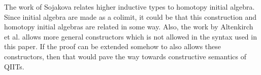 \documentclass[a4paper,UKenglish]{lipics-v2016}
\begin{document}
The work of Sojakova \cite{sojakova2015higher} relates higher inductive types to homotopy initial algebra.
Since initial algebra are made as a colimit, it could be that this construction and homotopy initial algebras are related in some way.
Also, the work by Altenkirch et al. \cite{altenkirch2016quotient} allows more general constructors which is not allowed in the syntax used in this paper.
If the proof can be extended somehow to also allows these constructors, then that would pave the way towards constructive semantics of QIITs.






\end{document}

